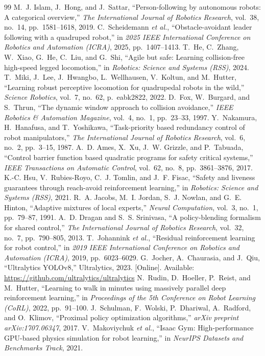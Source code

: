 \documentclass[letterpaper, 10 pt, conference]{ieeeconf}
\begin{document}
\begin{thebibliography}{99}
\setlength{\itemsep}{-1.2pt}
 M.~J. Islam, J.~Hong, and J.~Sattar,
``Person-following by autonomous robots: A categorical overview,'' \emph{The
International Journal of Robotics Research}, vol.~38, no.~14, pp.~1581--1618,
2019.
 C.~Scheidemann \emph{et al.},
``Obstacle-avoidant leader following with a quadruped robot,'' in
\emph{2025 IEEE International Conference on Robotics and Automation (ICRA)},
2025, pp.~1407--1413.
 T.~He, C.~Zhang, W.~Xiao, G.~He, C.~Liu, and G.~Shi,
``Agile but safe: Learning collision-free high-speed legged locomotion,'' in
\emph{Robotics: Science and Systems (RSS)}, 2024.
 T.~Miki, J.~Lee, J.~Hwangbo, L.~Wellhausen, V.~Koltun,
and M.~Hutter, ``Learning robust perceptive locomotion for quadrupedal
robots in the wild,'' \emph{Science Robotics}, vol.~7, no.~62, p.~eabk2822,
2022.
 D.~Fox, W.~Burgard, and S.~Thrun, ``The dynamic window
approach to collision avoidance,'' \emph{IEEE Robotics \& Automation
Magazine}, vol.~4, no.~1, pp.~23--33, 1997.
 Y.~Nakamura, H.~Hanafusa, and T.~Yoshikawa,
``Task-priority based redundancy control of robot manipulators,'' \emph{The
International Journal of Robotics Research}, vol.~6, no.~2, pp.~3--15, 1987.
 A.~D. Ames, X.~Xu, J.~W. Grizzle, and P.~Tabuada,
``Control barrier function based quadratic programs for safety critical
systems,'' \emph{IEEE Transactions on Automatic Control}, vol.~62, no.~8,
pp.~3861--3876, 2017.
 K.-C. Hsu, V.~Rubies-Royo, C.~J. Tomlin, and
J.~F. Fisac, ``Safety and liveness guarantees through reach-avoid
reinforcement learning,'' in \emph{Robotics: Science and Systems (RSS)},
2021.
 R.~A. Jacobs, M.~I. Jordan, S.~J. Nowlan, and
G.~E. Hinton, ``Adaptive mixtures of local experts,'' \emph{Neural
Computation}, vol.~3, no.~1, pp.~79--87, 1991.
 A.~D. Dragan and S.~S. Srinivasa, ``A
policy-blending formalism for shared control,'' \emph{The International
Journal of Robotics Research}, vol.~32, no.~7, pp.~790--805, 2013.
 T.~Johannink \emph{et al.}, ``Residual reinforcement
learning for robot control,'' in \emph{2019 IEEE International Conference on
Robotics and Automation (ICRA)}, 2019, pp.~6023--6029.
 G.~Jocher, A.~Chaurasia, and J.~Qiu, ``Ultralytics
YOLOv8,'' Ultralytics, 2023. [Online]. Available:
\url{https://github.com/ultralytics/ultralytics}
 N.~Rudin, D.~Hoeller, P.~Reist, and M.~Hutter,
``Learning to walk in minutes using massively parallel deep reinforcement
learning,'' in \emph{Proceedings of the 5th Conference on Robot Learning
(CoRL)}, 2022, pp.~91--100.
 J.~Schulman, F.~Wolski, P.~Dhariwal, A.~Radford, and
O.~Klimov, ``Proximal policy optimization algorithms,'' \emph{arXiv
preprint arXiv:1707.06347}, 2017.
 V.~Makoviychuk \emph{et al.}, ``Isaac Gym:
High-performance GPU-based physics simulation for robot learning,'' in
\emph{NeurIPS Datasets and Benchmarks Track}, 2021.
\end{thebibliography}
\end{document}
